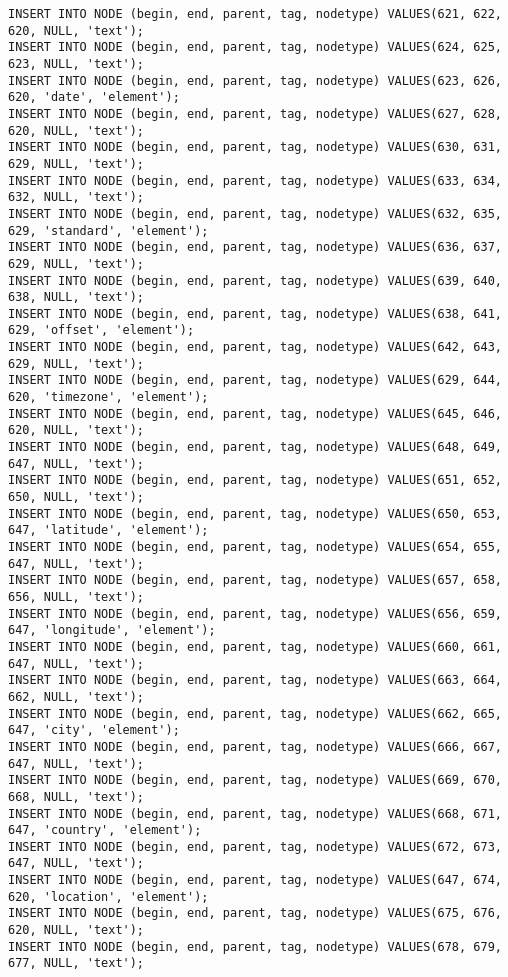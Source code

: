 \begin{verbatim}
INSERT INTO NODE (begin, end, parent, tag, nodetype) VALUES(621, 622, 620, NULL, 'text');
INSERT INTO NODE (begin, end, parent, tag, nodetype) VALUES(624, 625, 623, NULL, 'text');
INSERT INTO NODE (begin, end, parent, tag, nodetype) VALUES(623, 626, 620, 'date', 'element');
INSERT INTO NODE (begin, end, parent, tag, nodetype) VALUES(627, 628, 620, NULL, 'text');
INSERT INTO NODE (begin, end, parent, tag, nodetype) VALUES(630, 631, 629, NULL, 'text');
INSERT INTO NODE (begin, end, parent, tag, nodetype) VALUES(633, 634, 632, NULL, 'text');
INSERT INTO NODE (begin, end, parent, tag, nodetype) VALUES(632, 635, 629, 'standard', 'element');
INSERT INTO NODE (begin, end, parent, tag, nodetype) VALUES(636, 637, 629, NULL, 'text');
INSERT INTO NODE (begin, end, parent, tag, nodetype) VALUES(639, 640, 638, NULL, 'text');
INSERT INTO NODE (begin, end, parent, tag, nodetype) VALUES(638, 641, 629, 'offset', 'element');
INSERT INTO NODE (begin, end, parent, tag, nodetype) VALUES(642, 643, 629, NULL, 'text');
INSERT INTO NODE (begin, end, parent, tag, nodetype) VALUES(629, 644, 620, 'timezone', 'element');
INSERT INTO NODE (begin, end, parent, tag, nodetype) VALUES(645, 646, 620, NULL, 'text');
INSERT INTO NODE (begin, end, parent, tag, nodetype) VALUES(648, 649, 647, NULL, 'text');
INSERT INTO NODE (begin, end, parent, tag, nodetype) VALUES(651, 652, 650, NULL, 'text');
INSERT INTO NODE (begin, end, parent, tag, nodetype) VALUES(650, 653, 647, 'latitude', 'element');
INSERT INTO NODE (begin, end, parent, tag, nodetype) VALUES(654, 655, 647, NULL, 'text');
INSERT INTO NODE (begin, end, parent, tag, nodetype) VALUES(657, 658, 656, NULL, 'text');
INSERT INTO NODE (begin, end, parent, tag, nodetype) VALUES(656, 659, 647, 'longitude', 'element');
INSERT INTO NODE (begin, end, parent, tag, nodetype) VALUES(660, 661, 647, NULL, 'text');
INSERT INTO NODE (begin, end, parent, tag, nodetype) VALUES(663, 664, 662, NULL, 'text');
INSERT INTO NODE (begin, end, parent, tag, nodetype) VALUES(662, 665, 647, 'city', 'element');
INSERT INTO NODE (begin, end, parent, tag, nodetype) VALUES(666, 667, 647, NULL, 'text');
INSERT INTO NODE (begin, end, parent, tag, nodetype) VALUES(669, 670, 668, NULL, 'text');
INSERT INTO NODE (begin, end, parent, tag, nodetype) VALUES(668, 671, 647, 'country', 'element');
INSERT INTO NODE (begin, end, parent, tag, nodetype) VALUES(672, 673, 647, NULL, 'text');
INSERT INTO NODE (begin, end, parent, tag, nodetype) VALUES(647, 674, 620, 'location', 'element');
INSERT INTO NODE (begin, end, parent, tag, nodetype) VALUES(675, 676, 620, NULL, 'text');
INSERT INTO NODE (begin, end, parent, tag, nodetype) VALUES(678, 679, 677, NULL, 'text');

\end{verbatim}
